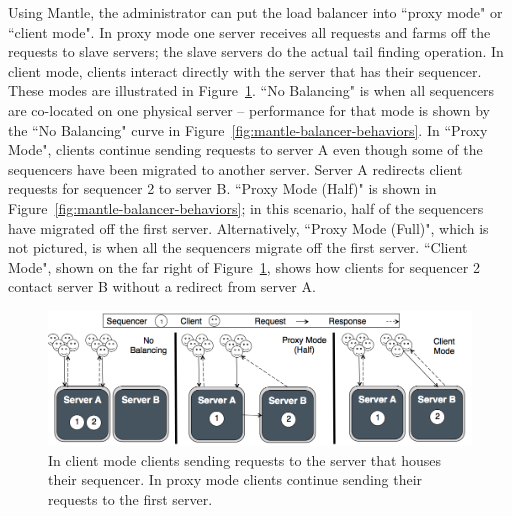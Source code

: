 Using Mantle, the administrator can put the load balancer into ``proxy mode" or
``client mode". In proxy mode one server receives all requests and farms off
the requests to slave servers; the slave servers do the actual tail finding
operation. In client mode, clients interact directly with the server that has
their sequencer.  These modes are illustrated in Figure~\ref{fig:mantle-modes}.
``No Balancing" is when all sequencers are co-located on one physical server --
performance for that mode is shown by the ``No Balancing" curve in
Figure~\ref{fig:mantle-balancer-behaviors}. In ``Proxy Mode", clients continue
sending requests to server A even though some of the sequencers have been
migrated to another server. Server A redirects client requests for sequencer 2
to server B.  ``Proxy Mode (Half)" is shown in
Figure~\ref{fig:mantle-balancer-behaviors}; in this scenario, half of the
sequencers have migrated off the first server. Alternatively, ``Proxy Mode
(Full)", which is not pictured, is when all the sequencers migrate off the
first server.  ``Client Mode", shown on the far right of
Figure~\ref{fig:mantle-modes}, shows how clients for sequencer 2 contact server
B without a redirect from server A.

\begin{figure}[t!]
\centering
\includegraphics{figures/mantle-modes.png}
\caption{ In client mode clients sending requests to the server that houses
their sequencer. In proxy mode clients continue sending their requests to the
first server.  }\label{fig:mantle-modes}
\end{figure}

